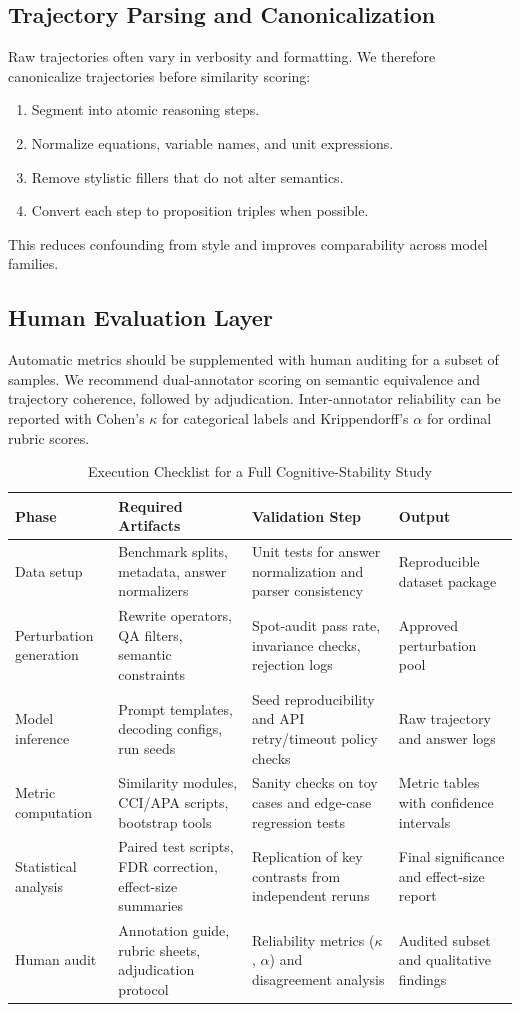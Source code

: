 \documentclass[conference]{IEEEtran}
\begin{document}
\subsection{Trajectory Parsing and Canonicalization}
Raw trajectories often vary in verbosity and formatting. We therefore canonicalize trajectories before similarity scoring:
\begin{enumerate}[leftmargin=*]
\item Segment into atomic reasoning steps.
\item Normalize equations, variable names, and unit expressions.
\item Remove stylistic fillers that do not alter semantics.
\item Convert each step to proposition triples when possible.
\end{enumerate}
This reduces confounding from style and improves comparability across model families.

\subsection{Human Evaluation Layer}
Automatic metrics should be supplemented with human auditing for a subset of samples. We recommend dual-annotator scoring on semantic equivalence and trajectory coherence, followed by adjudication. Inter-annotator reliability can be reported with Cohen's $\kappa$ for categorical labels and Krippendorff's $\alpha$ for ordinal rubric scores.

\begin{table}[!t]
\caption{Execution Checklist for a Full Cognitive-Stability Study}
\label{tab:execution-checklist}
\centering
\begin{tabular}{p{2.1cm}p{4.8cm}p{5.2cm}p{2.2cm}}
\toprule
Phase & Required Artifacts & Validation Step & Output \\
\midrule
Data setup & Benchmark splits, metadata, answer normalizers & Unit tests for answer normalization and parser consistency & Reproducible dataset package \\
Perturbation generation & Rewrite operators, QA filters, semantic constraints & Spot-audit pass rate, invariance checks, rejection logs & Approved perturbation pool \\
Model inference & Prompt templates, decoding configs, run seeds & Seed reproducibility and API retry/timeout policy checks & Raw trajectory and answer logs \\
Metric computation & Similarity modules, CCI/APA scripts, bootstrap tools & Sanity checks on toy cases and edge-case regression tests & Metric tables with confidence intervals \\
Statistical analysis & Paired test scripts, FDR correction, effect-size summaries & Replication of key contrasts from independent reruns & Final significance and effect-size report \\
Human audit & Annotation guide, rubric sheets, adjudication protocol & Reliability metrics ($\kappa$, $\alpha$) and disagreement analysis & Audited subset and qualitative findings \\
\bottomrule
\end{tabular}
\end{table}
\end{document}
